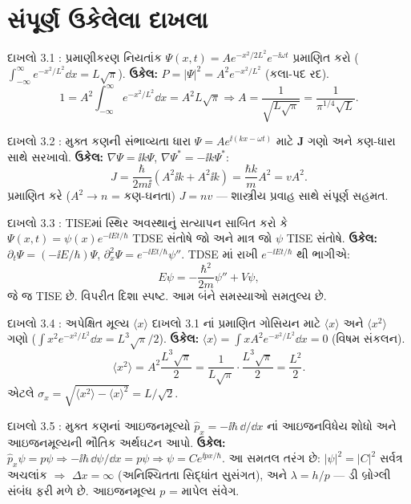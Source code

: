 \section{સંપૂર્ણ ઉકેલેલા દાખલા}
\begin{dahlo}{દાખલો 3.1 : પ્રમાણીકરણ નિયતાંક}
$\Psi(x,t)=A e^{-x^{2}/2L^{2}}e^{-\ii\omega t}$ પ્રમાણિત કરો ($\int_{-\infty}^{\infty}e^{-x^{2}/L^{2}}\dd x=L\sqrt{\pi}$).
\tcblower
\textbf{ઉકેલ:} $P=|\Psi|^{2}=A^{2}e^{-x^{2}/L^{2}}$ (કલા-પદ રદ).
\[
1=A^{2}\int_{-\infty}^{\infty}e^{-x^{2}/L^{2}}\dd x=A^{2}L\sqrt{\pi}
\Rightarrow A=\frac{1}{\sqrt{L\sqrt{\pi}}}=\frac{1}{\pi^{1/4}\sqrt L}. 
\]
\end{dahlo}

\begin{dahlo}{દાખલો 3.2 : મુક્ત કણની સંભાવ્યતા ધારા}
$\Psi=Ae^{\ii(kx-\omega t)}$ માટે $\mathbf J$ ગણો અને કણ-ધારા સાથે સરખાવો.
\tcblower
\textbf{ઉકેલ:} $\nabla\Psi=\ii k\Psi$, $\nabla\Psi^{*}=-\ii k\Psi^{*}$:
\[
J=\frac{\hbar}{2m\ii}\left(A^{2}\ii k+A^{2}\ii k\right)=\frac{\hbar k}{m}A^{2}=vA^{2}.
\]
પ્રમાણિત કરે ($A^{2}\to n$ = કણ-ઘનતા) $J=nv$ — શાસ્ત્રીય પ્રવાહ સાથે સંપૂર્ણ સહમત.
\end{dahlo}

\begin{dahlo}{દાખલો 3.3 : TISEમાં સ્થિર અવસ્થાનું સત્યાપન}
સાબિત કરો કે $\Psi(x,t)=\psi(x)e^{-\ii Et/\hbar}$ TDSE સંતોષે જો અને માત્ર જો $\psi$ TISE સંતોષે.
\tcblower
\textbf{ઉકેલ:} $\partial_t\Psi=(-\ii E/\hbar)\Psi$, $\partial_x^{2}\Psi=e^{-\ii Et/\hbar}\psi''$. TDSE માં રાખી $e^{-\ii Et/\hbar}$ થી ભાગીએ:
\[
E\psi=-\frac{\hbar^{2}}{2m}\psi''+V\psi ,
\]
જે જ TISE છે. વિપરીત દિશા સ્પષ્ટ. આમ બંને સમસ્યાઓ સમતુલ્ય છે.
\end{dahlo}

\begin{dahlo}{દાખલો 3.4 : અપેક્ષિત મૂલ્ય $\langle x\rangle$}
દાખલો 3.1 નાં પ્રમાણિત ગોસિયન માટે $\langle x\rangle$ અને $\langle x^{2}\rangle$ ગણો ($\int x^{2}e^{-x^{2}/L^{2}}\dd x=L^{3}\sqrt\pi/2$).
\tcblower
\textbf{ઉકેલ:} $\langle x\rangle=\int xA^{2}e^{-x^{2}/L^{2}}\dd x=0$ (વિષમ સંકલન).
\[
\langle x^{2}\rangle=A^{2}\frac{L^{3}\sqrt{\pi}}{2}=\frac{1}{L\sqrt{\pi}}\cdot\frac{L^{3}\sqrt{\pi}}{2}=\frac{L^{2}}{2}.
\]
એટલે $\sigma_x=\sqrt{\langle x^2\rangle-\langle x\rangle^2}=L/\sqrt2$.
\end{dahlo}

\begin{dahlo}{દાખલો 3.5 : મુક્ત કણનાં આઇજનમૂલ્યો}
$\hat p_x=-\ii\hbar\,\dd/\dd x$ નાં આઇજનવિધેય શોધો અને આઇજનમૂલ્યની ભૌતિક અર્થઘટન આપો.
\tcblower
\textbf{ઉકેલ:} $\hat p_x\psi=p\psi\Rightarrow-\ii\hbar\,\dd\psi/\dd x=p\psi\Rightarrow\psi=Ce^{\ii px/\hbar}$.
આ સમતલ તરંગ છે: $|\psi|^{2}=|C|^{2}$ સર્વત્ર અચલાંક $\Rightarrow$ $\Delta x=\infty$ (અનિશ્ચિતતા સિદ્ધાંત સુસંગત), અને $\lambda=h/p$ — ડી બ્રોગ્લી સંબંધ ફરી મળે છે. આઇજનમૂલ્ય $p$ = માપેલ સંવેગ.
\end{dahlo}

